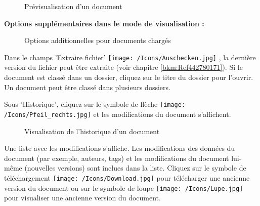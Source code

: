 \begin{figure}[H]
\caption{Prévisualisation d'un document}
\end{figure}

\textbf{Options supplémentaires dans le mode de visualisation :}

\begin{figure}[H]
\caption{Options additionnelles pour documents chargés}
\end{figure}

Dans le champs 'Extraire fichier' \texttt{[image: /Icons/Auschecken.jpg]} , la dernière version du fichier peut être extraite (voir chapitre \ref{bkm:Ref442780171}). Si le document est classé dans un dossier, cliquez sur le titre du dossier  pour l'ouvrir. Un document peut être classé dans plusieurs dossiers. \newline 

\vspace{\baselineskip}

Sous 'Historique', cliquez sur le symbole de flèche \texttt{[image: /Icons/Pfeil\_rechts.jpg]}  et les modifications du document s'affichent.

\begin{figure}[H]
\caption{Visualisation de l'historique d'un document}
\end{figure}

Une liste avec les modifications s'affiche. Les modifications des données du document (par exemple, auteurs, tags) et les modifications du document lui-même (nouvelles versions) sont inclues dans la liste. Cliquez sur le symbole de téléchargement \texttt{[image: /Icons/Download.jpg]}  pour télécharger une ancienne version du document ou sur le symbole de loupe \texttt{[image: /Icons/Lupe.jpg]}  pour visualiser une ancienne version du document. \newline

